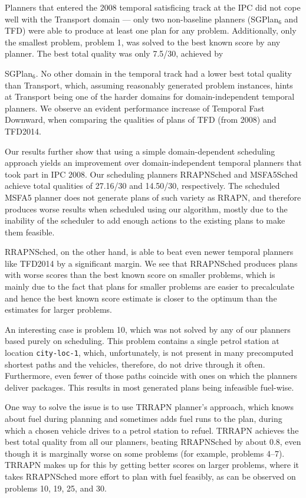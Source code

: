 Planners that entered the 2008 temporal satisficing track at the IPC did not cope well with the Transport domain
--- only two non-baseline planners (SGPlan$_6$ and TFD) were able to produce at least one plan
for any problem. Additionally, only the smallest problem, problem 1, was solved
to the best known score by any planner.
The best total quality was only 7.5/30, achieved by
{SGPlan$_6$. No other domain in the temporal track had a lower best total quality
than Transport, which, assuming reasonably generated problem instances, hints
at Transport being one of the harder domains for domain-independent temporal planners.
We observe an evident performance increase of Temporal Fast Downward,
when comparing the qualities of plans of TFD (from 2008) and TFD2014.

Our results further show that using a simple domain-dependent scheduling approach
yields an improvement over domain-independent temporal planners
that took part in IPC 2008. Our scheduling planners RRAPNSched
and MSFA5Sched achieve total qualities of 27.16/30
and 14.50/30, respectively.
The scheduled MSFA5 planner does not generate plans of such variety as RRAPN,
and therefore produces worse results when scheduled using our algorithm,
mostly due to the inability of the scheduler to add enough 
actions to the existing plans to make them feasible.

RRAPNSched, on the other hand, is able to beat even newer temporal planners like TFD2014
by a significant margin.
We see that RRAPNSched produces plans with worse scores than the best known score on smaller problems, which is mainly due to the fact that plans for smaller problems are easier to precalculate and hence the best known score estimate is closer
to the optimum than the estimates for larger problems.

An interesting case is problem 10,
which was not solved by any of our planners based purely on scheduling.
This problem contains a single petrol station at location \texttt{city-loc-1},
which, unfortunately, is not present in many precomputed shortest
paths and the vehicles, therefore, do not drive through it often.
Furthermore, even fewer of those paths coincide with ones
on which the planners deliver packages.
This results in most generated plans being infeasible fuel-wise.

One way to solve the issue is to use TRRAPN planner's approach,
which knows about fuel during planning and 
sometimes adds fuel runs to the plan, during which a chosen vehicle
drives to a petrol station to refuel.
TRRAPN achieves the best total quality from all our planners,
beating RRAPNSched by about 0.8,
even though it is marginally worse on some problems (for example, problems 4--7). TRRAPN makes up for this by getting better scores on
larger problems, where it takes RRAPNSched more effort to plan with fuel feasibly,
as can be observed on problems 10, 19, 25, and 30.

}
